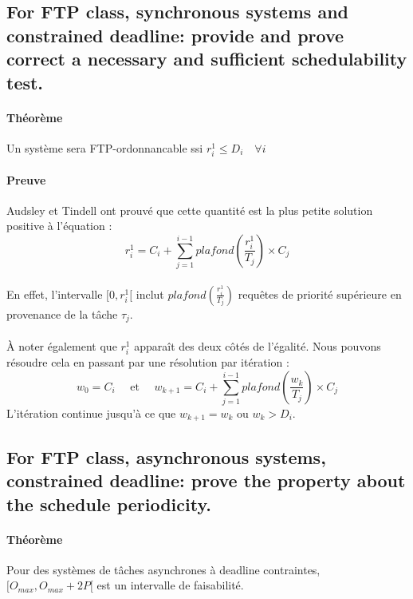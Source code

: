 \subsection{For FTP class, synchronous systems and constrained deadline: provide and prove correct a necessary and sufficient schedulability test.}
\paragraph{Théorème} Un système sera FTP-ordonnancable ssi $r_{i}^{1} \leq D_{i} \quad \forall i$

\paragraph{Preuve} Audsley et Tindell ont prouvé que cette quantité est la plus petite solution positive à l'équation :
\begin{equation}
r_{i}^{1} = C_{i} + \sum_{j=1}^{i-1} plafond \left(\frac{r_{i}^{1}}{T_{j}} \right) \times C_{j}
\end{equation}
\paragraph{}
En effet, l'intervalle $[0, r_{i}^{1}[$ inclut $plafond \left(\frac{r_{i}^{1}}{T_{j}} \right)$ requêtes de priorité supérieure en provenance de la tâche $\tau_{j}$.
\paragraph{} À noter également que $r_{i}^{1}$ apparaît des deux côtés de l'égalité. Nous pouvons résoudre cela en passant par une résolution par itération :
\begin{equation}
w_{0} = C_{i} \quad \text{ et } \quad
w_{k+1} =  C_{i} + \sum_{j=1}^{i-1} plafond \left(\frac{w_{k}}{T_{j}} \right) \times C_{j}
\end{equation}
L'itération continue jusqu'à ce que $w_{k+1} = w_{k}$ ou $w_{k} > D_{i}$.

\subsection{For FTP class, asynchronous systems, constrained deadline: prove the property about the schedule periodicity.}
\paragraph{Théorème} Pour des systèmes de tâches asynchrones à deadline contraintes, $[O_{max}, O_{max} + 2P[$ est un intervalle de faisabilité.

